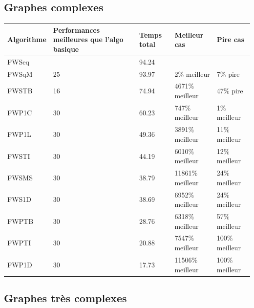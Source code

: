 \documentclass[a4paper,11pt]{article}
\begin{document}
\subsection{Graphes complexes}

\begin{center}
  \begin{tabular}{p{2cm} | p{4.5cm} | p{2cm} | p{3cm} | p{3cm}}
    \centering \textbf{Algorithme} & \centering \textbf {Performances meilleures que l'algo basique} & \centering \textbf{Temps total} & \centering \textbf{Meilleur cas} & \centering \textbf{Pire cas} \tabularnewline
    \hline
    FWSeq & & 94.24 & & \\
    \hline
    \hline
    FWSqM & 25 & 93.97 & 2\% meilleur & 7\% pire \\
    \hline
    FWSTB & 16 & 74.94 & 4671\% meilleur & 47\% pire \\
    \hline
    FWP1C & 30 & 60.23 & 747\% meilleur & 1\% meilleur \\
    \hline
    FWP1L & 30 & 49.36 & 3891\% meilleur & 11\% meilleur \\
    \hline
    FWSTI & 30 & 44.19 & 6010\% meilleur & 12\% meilleur \\
    \hline
    FWSMS & 30 & 38.79 & 11861\% meilleur & 24\% meilleur \\
    \hline
    FWS1D & 30 & 38.69 & 6952\% meilleur & 24\% meilleur \\
    \hline
    FWPTB & 30 & 28.76 & 6318\% meilleur & 57\% meilleur \\
    \hline
    FWPTI & 30 & 20.88 & 7547\% meilleur & 100\% meilleur \\
    \hline
    FWP1D & 30 & 17.73 & 11506\% meilleur & 100\% meilleur \\
    \hline
  \end{tabular}
\end{center}

\subsection{Graphes très complexes}
\end{document}
